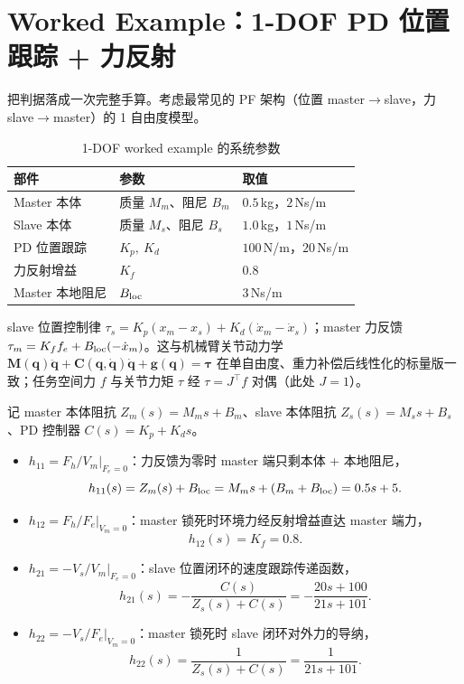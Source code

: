 \section{Worked Example：1-DOF PD 位置跟踪 + 力反射}
\label{sec:ts-example}

把判据落成一次完整手算。考虑最常见的 PF 架构（位置 master$\to$slave，力 slave$\to$master）的 1 自由度模型。

\begin{table}[H]\centering\small
\caption{1-DOF worked example 的系统参数}
\label{tab:ts-example-param}
\begin{tabular}{lll}
\toprule
部件 & 参数 & 取值 \\
\midrule
Master 本体 & 质量 $M_m$、阻尼 $B_m$ & $0.5\,$kg，$2\,$Ns/m \\
Slave 本体 & 质量 $M_s$、阻尼 $B_s$ & $1.0\,$kg，$1\,$Ns/m \\
PD 位置跟踪 & $K_p,\ K_d$ & $100\,$N/m，$20\,$Ns/m \\
力反射增益 & $K_f$ & $0.8$ \\
Master 本地阻尼 & $B_{\rm loc}$ & $3\,$Ns/m \\
\bottomrule
\end{tabular}
\end{table}

\noindent slave 位置控制律 $\tau_s=K_p(x_m-x_s)+K_d(\dot x_m-\dot x_s)$；master 力反馈 $\tau_m=K_f f_e+B_{\rm loc}(-\dot x_m)$。这与机械臂关节动力学 $\mathbf M(\mathbf q)\ddot{\mathbf q}+\mathbf C(\mathbf q,\dot{\mathbf q})\dot{\mathbf q}+\mathbf g(\mathbf q)=\boldsymbol\tau$ 在单自由度、重力补偿后线性化的标量版一致；任务空间力 $f$ 与关节力矩 $\tau$ 经 $\tau=J^\top f$ 对偶（此处 $J=1$）。

\begin{derivation}[推导 $h$ 参数]
记 master 本体阻抗 $Z_m(s)=M_m s+B_m$、slave 本体阻抗 $Z_s(s)=M_s s+B_s$、PD 控制器 $C(s)=K_p+K_d s$。
\begin{itemize}
  \item $h_{11}=F_h/V_m\big|_{F_e=0}$：力反馈为零时 master 端只剩本体 + 本地阻尼，
  \[
    h_{11}(s)=Z_m(s)+B_{\rm loc}=M_m s+(B_m+B_{\rm loc})=0.5s+5.
  \]
  \item $h_{12}=F_h/F_e\big|_{V_m=0}$：master 锁死时环境力经反射增益直达 master 端力，
  \[
    h_{12}(s)=K_f=0.8.
  \]
  \item $h_{21}=-V_s/V_m\big|_{F_e=0}$：slave 位置闭环的速度跟踪传递函数，
  \[
    h_{21}(s)=-\frac{C(s)}{Z_s(s)+C(s)}=-\frac{20s+100}{21s+101}.
  \]
  \item $h_{22}=-V_s/F_e\big|_{V_m=0}$：master 锁死时 slave 闭环对外力的导纳，
  \[
    h_{22}(s)=\frac{1}{Z_s(s)+C(s)}=\frac{1}{21s+101}.
  \]
\end{itemize}
\end{derivation}

